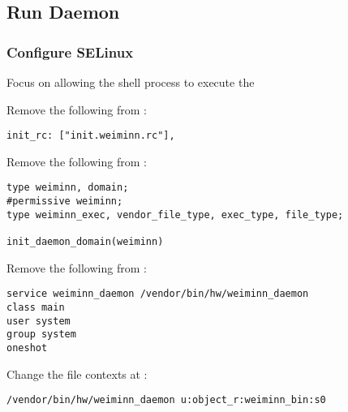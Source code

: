\subsection{Run Daemon}
\label{task:20231224_aosp}

\subsubsection{Configure SELinux}

Focus on allowing the shell process to execute the 

Remove the following from :
\begin{lstlisting}
init_rc: ["init.weiminn.rc"], 
\end{lstlisting}

Remove the following from :
\begin{lstlisting}
type weiminn, domain; 
#permissive weiminn;
type weiminn_exec, vendor_file_type, exec_type, file_type; 

init_daemon_domain(weiminn) 
\end{lstlisting}

Remove the following from :
\begin{lstlisting}
service weiminn_daemon /vendor/bin/hw/weiminn_daemon
class main
user system
group system
oneshot
\end{lstlisting}

Change the file contexts at :
\begin{lstlisting}
/vendor/bin/hw/weiminn_daemon u:object_r:weiminn_bin:s0
\end{lstlisting}



